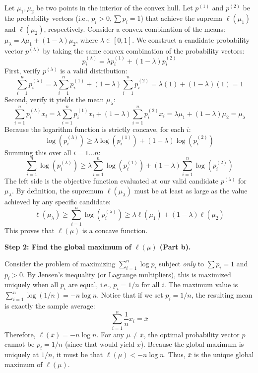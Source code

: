 \begin{solution}
Let $\mu_1, \mu_2$ be two points in the interior of the convex hull. Let $p^{(1)}$ and $p^{(2)}$ be the probability vectors (i.e., $p_i > 0, \sum p_i = 1$) that achieve the suprema $\ell(\mu_1)$ and $\ell(\mu_2)$, respectively.
Consider a convex combination of the means: $\mu_\lambda = \lambda \mu_1 + (1-\lambda) \mu_2$, where $\lambda \in [0, 1]$.
We construct a candidate probability vector $p^{(\lambda)}$ by taking the same convex combination of the probability vectors:
\[ p^{(\lambda)}_i = \lambda p^{(1)}_i + (1-\lambda) p^{(2)}_i \]
First, verify $p^{(\lambda)}$ is a valid distribution:
\[ \sum_{i=1}^n p^{(\lambda)}_i = \lambda \sum_{i=1}^n p^{(1)}_i + (1-\lambda) \sum_{i=1}^n p^{(2)}_i = \lambda(1) + (1-\lambda)(1) = 1 \]
Second, verify it yields the mean $\mu_\lambda$:
\[ \sum_{i=1}^n p^{(\lambda)}_i x_i = \lambda \sum_{i=1}^n p^{(1)}_i x_i + (1-\lambda) \sum_{i=1}^n p^{(2)}_i x_i = \lambda \mu_1 + (1-\lambda) \mu_2 = \mu_\lambda \]
Because the logarithm function is strictly concave, for each $i$:
\[ \log(p^{(\lambda)}_i) \geq \lambda \log(p^{(1)}_i) + (1-\lambda) \log(p^{(2)}_i) \]
Summing this over all $i=1 \dots n$:
\[ \sum_{i=1}^n \log(p^{(\lambda)}_i) \geq \lambda \sum_{i=1}^n \log(p^{(1)}_i) + (1-\lambda) \sum_{i=1}^n \log(p^{(2)}_i) \]
The left side is the objective function evaluated at our valid candidate $p^{(\lambda)}$ for $\mu_\lambda$. By definition, the supremum $\ell(\mu_\lambda)$ must be at least as large as the value achieved by any specific candidate:
\[ \ell(\mu_\lambda) \geq \sum_{i=1}^n \log(p^{(\lambda)}_i) \geq \lambda \ell(\mu_1) + (1-\lambda) \ell(\mu_2) \]
This proves that $\ell(\mu)$ is a concave function.

\textbf{Step 2: Find the global maximum of $\ell(\mu)$ (Part b).}

Consider the problem of maximizing $\sum_{i=1}^n \log p_i$ subject \textit{only} to $\sum p_i = 1$ and $p_i > 0$.
By Jensen's inequality (or Lagrange multipliers), this is maximized uniquely when all $p_i$ are equal, i.e., $p_i = 1/n$ for all $i$.
The maximum value is $\sum_{i=1}^n \log(1/n) = -n \log n$.
Notice that if we set $p_i = 1/n$, the resulting mean is exactly the sample average:
\[ \sum_{i=1}^n \frac{1}{n} x_i = \bar{x} \]
Therefore, $\ell(\bar{x}) = -n \log n$.
For any $\mu \neq \bar{x}$, the optimal probability vector $p$ cannot be $p_i = 1/n$ (since that would yield $\bar{x}$). Because the global maximum is uniquely at $1/n$, it must be that $\ell(\mu) < -n \log n$.
Thus, $\bar{x}$ is the unique global maximum of $\ell(\mu)$.


\end{solution}
